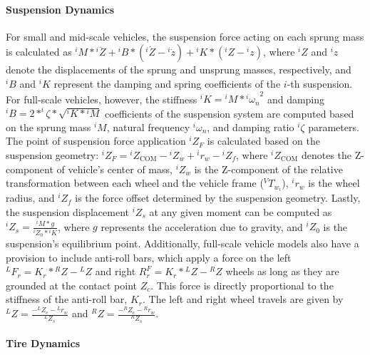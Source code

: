 \paragraph{Suspension Dynamics}
\label{Suspension Dynamics}

For small and mid-scale vehicles, the suspension force acting on each sprung mass is calculated as ${^iM} * {^i{\ddot{Z}}} + {^iB} * ({^i{\dot{Z}}}-{^i{\dot{z}}}) + {^iK} * ({^i{Z}}-{^i{z}})$, where $^iZ$ and $^iz$ denote the displacements of the sprung and unsprung masses, respectively, and $^iB$ and $^iK$ represent the damping and spring coefficients of the $i$-th suspension. For full-scale vehicles, however, the stiffness ${^iK} = {^iM} * {^i\omega_n}^2$ and damping $^iB = 2 * ^i\zeta * \sqrt{{^iK} * {^iM}}$ coefficients of the suspension system are computed based on the sprung mass ${^iM}$, natural frequency ${^i\omega_n}$, and damping ratio ${^i\zeta}$ parameters. The point of suspension force application ${^iZ_F}$ is calculated based on the suspension geometry:
${^iZ_F} = {^iZ_\text{COM}} - {^iZ_w} + {^ir_w} - {^iZ_f}$, where $^iZ_\text{COM}$ denotes the Z-component of vehicle's center of mass, $^iZ_w$ is the Z-component of the relative transformation between each wheel and the vehicle frame ($^VT_{w_i}$), $^ir_w$ is the wheel radius, and $^iZ_f$ is the force offset determined by the suspension geometry. Lastly, the suspension displacement $^iZ_s$ at any given moment can be computed as ${^iZ_s} = \frac{{^iM} * g}{{^iZ_0} * {^iK}}$, where $g$ represents the acceleration due to gravity, and $^iZ_0$ is the suspension's equilibrium point. Additionally, full-scale vehicle models also have a provision to include anti-roll bars, which apply a force on the left ${^LF_r} = K_r * {^RZ} - {^LZ}$ and right ${R^F_r} = K_r * {^LZ} - {^RZ}$ wheels as long as they are grounded at the contact point $Z_c$. This force is directly proportional to the stiffness of the anti-roll bar, $K_r$. The left and right wheel travels are given by ${^LZ} = \frac{-{^LZ_c} - {^Lr_w}}{^LZ_s}$ and ${^RZ} = \frac{-{^RZ_c} - {^Rr_w}}{^RZ_s}$.

\paragraph{Tire Dynamics}
\label{Tire Dynamics}

